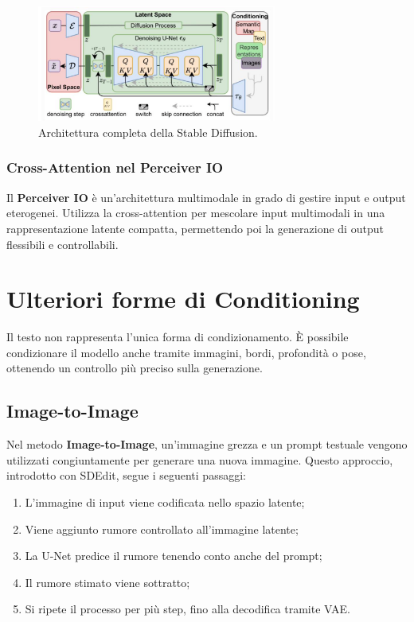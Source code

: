 \begin{figure}
    \centering
    \includegraphics[width=0.7\textwidth]{figure/StableDiffusionArchitecture.png}
    \caption{Architettura completa della Stable Diffusion.}
    \label{fig:StabDiffArch}
\end{figure}

\subsubsection{Cross-Attention nel Perceiver IO}

Il \textbf{Perceiver IO} è un'architettura multimodale in grado di gestire input e output eterogenei. Utilizza la cross-attention per mescolare input multimodali in una rappresentazione latente compatta, permettendo poi la generazione di output flessibili e controllabili.

\section{Ulteriori forme di Conditioning}

Il testo non rappresenta l’unica forma di condizionamento. È possibile condizionare il modello anche tramite immagini, bordi, profondità o pose, ottenendo un controllo più preciso sulla generazione.

\subsection{Image-to-Image}

Nel metodo \textbf{Image-to-Image}, un’immagine grezza e un prompt testuale vengono utilizzati congiuntamente per generare una nuova immagine. Questo approccio, introdotto con SDEdit, segue i seguenti passaggi:

\begin{enumerate}
    \item L’immagine di input viene codificata nello spazio latente;
    \item Viene aggiunto rumore controllato all’immagine latente;
    \item La U-Net predice il rumore tenendo conto anche del prompt;
    \item Il rumore stimato viene sottratto;
    \item Si ripete il processo per più step, fino alla decodifica tramite VAE.
\end{enumerate}

